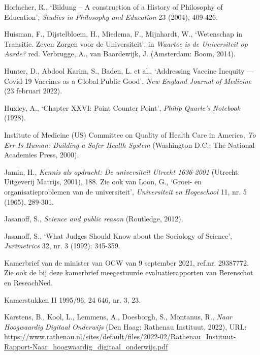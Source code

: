\documentclass[smallauthor, chapterhaspagenum, nochapterinheader, pagenuminheader,  bigchapnum,medium2, tocpages, garamond, titleinheader]{jote-book}
\begin{document}
\begin{references}
		Horlacher, R., ‘Bildung -- A construction of a History of Philosophy of Education', \emph{Studies in Philosophy and Education} 23 (2004), 409-426.



		Huisman, F., Dijstelbloem, H., Miedema, F., Mijnhardt, W., ‘Wetenschap in Transitie. Zeven Zorgen voor de Universiteit', in \emph{Waartoe}\emph{ is de Universiteit op }\emph{Aarde}\emph{?} red. Verbrugge, A., van Baardewijk, J. (Amsterdam: Boom, 2014).



		Hunter, D., Abdool Karim, S., Baden, L. et al., ‘Addressing Vaccine Inequity — Covid-19 Vaccines as a Global Public Good', \emph{N}\emph{ew }\emph{E}\emph{ngland }\emph{J}\emph{ournal of }\emph{M}\emph{edicine} (23 februari 2022).



		Huxley, A., ‘Chapter XXVI: Point Counter Point', \emph{Philip }\emph{Quarle's}\emph{ Notebook} (1928).



		Institute of Medicine (US) Committee on Quality of Health Care in America, \emph{To Err Is Human: Building a Safer Health System}\emph{ }(Washington D.C.: The National Academies Press, 2000).



		Jamin, H., \emph{Kennis}\emph{ }\emph{als}\emph{ }\emph{opdracht}\emph{: De }\emph{universiteit}\emph{ Utrecht 1636-2001} (Utrecht: Uitgeverij Matrijs, 2001), 188. Zie ook van Loon, G., ‘Groei- en organisatieproblemen van de universiteit', \emph{Universiteit }\emph{en}\emph{ }\emph{Hogeschool} 11, nr. 5 (1965), 289-301.



		Jasanoff, S., \emph{Science and public reason} (Routledge, 2012).



		Jasanoff, S., ‘What Judges Should Know about the Sociology of Science', \emph{Jurimetrics} 32, nr. 3 (1992): 345-359.



		Kamerbrief van de minister van OCW van 9 september 2021, ref.nr. 29387772. Zie ook de bij deze kamerbrief meegestuurde evaluatierapporten van Berenschot en ReseachNed.



		Kamerstukken II 1995/96, 24 646, nr. 3, 23.



		Karstens, B., Kool, L., Lemmens, A., Doesborgh, S., Montanus, R., \emph{Naar}\emph{ }\emph{Hoogwaardig}\emph{ }\emph{Digitaal}\emph{ }\emph{Onderwijs} (Den Haag: Rathenau Instituut, 2022), URL: \href{https://www.rathenau.nl/sites/default/files/2022-02/Rathenau_Instituut-Rapport-Naar_hoogwaardig_digitaal_onderwijs.pdf}{https://www.rathenau.nl/sites/default/files/2022-02/Rathenau\_Instituut-Rapport-Naar\_hoogwaardig\_digitaal\_onderwijs.pdf}




\end{references}
\end{document}
